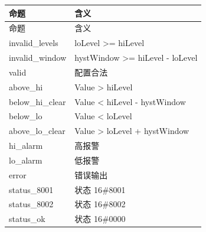 \begin{longtable}{L{3.3cm}L{10.0cm}}

\toprule

命题 & 含义\\

\midrule

\endfirsthead

\toprule

命题 & 含义\\

\midrule

\endhead

{\ttfamily invalid\_levels} & loLevel >= hiLevel\\

{\ttfamily invalid\_window} & hystWindow >= hiLevel - loLevel\\

{\ttfamily valid} & 配置合法\\

{\ttfamily above\_hi} & Value > hiLevel\\

{\ttfamily below\_hi\_clear} & Value < hiLevel - hystWindow\\

{\ttfamily below\_lo} & Value < loLevel\\

{\ttfamily above\_lo\_clear} & Value > loLevel + hystWindow\\

{\ttfamily hi\_alarm} & 高报警\\

{\ttfamily lo\_alarm} & 低报警\\

{\ttfamily error} & 错误输出\\

{\ttfamily status\_8001} & 状态 16\#8001\\

{\ttfamily status\_8002} & 状态 16\#8002\\

{\ttfamily status\_ok} & 状态 16\#0000\\

\bottomrule

\end{longtable}

